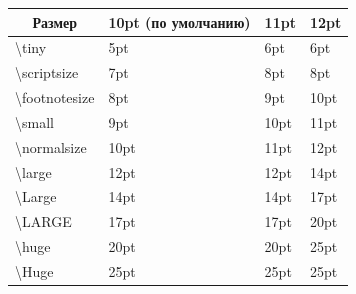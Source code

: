 \documentclass{article}
\begin{document}
    \pagestyle{empty}
    \def\arraystretch{1.5}
    \begin{tabular}{|l|l|l|l|}\hline
        \multicolumn{1}{|c}{\textbf{Размер}} & \multicolumn{1}{|c}{\textbf{10pt (по умолчанию)}} 
            & \multicolumn{1}{|c}{\textbf{11pt}} & \multicolumn{1}{|c|}{\textbf{12pt}} \\\hline
        \textbackslash{tiny}            & 5pt   & 6pt   & 6pt   \\
        \textbackslash{scriptsize}      & 7pt   & 8pt   & 8pt   \\
        \textbackslash{footnotesize}    & 8pt   & 9pt   & 10pt  \\
        \textbackslash{small}           & 9pt   & 10pt  & 11pt  \\
        \textbackslash{normalsize}      & 10pt  & 11pt  & 12pt  \\
        \textbackslash{large}           & 12pt  & 12pt  & 14pt  \\
        \textbackslash{Large}           & 14pt  & 14pt  & 17pt  \\
        \textbackslash{LARGE}           & 17pt  & 17pt  & 20pt  \\
        \textbackslash{huge}            & 20pt  & 20pt  & 25pt  \\
        \textbackslash{Huge}            & 25pt  & 25pt  & 25pt  \\\hline
    \end{tabular}
\end{document}
